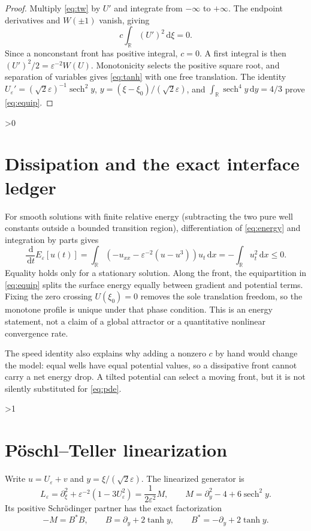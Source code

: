 \documentclass[10pt]{article}
\newcommand{\dd}{\,\mathrm d}
\newcommand{\sech}{\operatorname{sech}}
\newcommand{\eps}{\varepsilon}
\begin{document}
\begin{proof}
Multiply \eqref{eq:tw} by $U'$ and integrate from $-\infty$ to $+\infty$.
The endpoint derivatives and $W(\pm1)$ vanish, giving
\[
 c\int_{\mathbb R}(U')^2\dd\xi=0.
\]
Since a nonconstant front has positive integral, $c=0$.  A first integral is
then $(U')^2/2=\eps^{-2}W(U)$.  Monotonicity selects the positive square root,
and separation of variables gives \eqref{eq:tanh} with one free translation.
The identity $U_\eps'=(\sqrt2\eps)^{-1}\sech^2 y$,
$y=(\xi-\xi_0)/(\sqrt2\eps)$, and
$\int_{\mathbb R}\sech^4y\dd y=4/3$ prove \eqref{eq:equip}.
\end{proof}

\ifnum\CRevisionRound>0
\section{Dissipation and the exact interface ledger}
For smooth solutions with finite relative energy (subtracting the two pure
well constants outside a bounded transition region), differentiation of
\eqref{eq:energy} and integration by parts gives
\begin{equation}
 \frac{\dd}{\dd t}E_\eps[u(t)]
 =\int_{\mathbb R}(-u_{xx}-\eps^{-2}(u-u^3))u_t\dd x
 =-\int_{\mathbb R}u_t^2\dd x\leq0.
 \label{eq:dissipation}
\end{equation}
Equality holds only for a stationary solution.  Along the front, the
equipartition in \eqref{eq:equip} splits the surface energy equally between
gradient and potential terms.  Fixing the zero crossing $U(\xi_0)=0$ removes
the sole translation freedom, so the monotone profile is unique under that
phase condition.  This is an energy statement, not a claim of a global
attractor or a quantitative nonlinear convergence rate.

The speed identity also explains why adding a nonzero $c$ by hand would change
the model: equal wells have equal potential values, so a dissipative front
cannot carry a net energy drop.  A tilted potential can select a moving front,
but it is not silently substituted for \eqref{eq:pde}.
\fi

\ifnum\CRevisionRound>1
\section{Pöschl--Teller linearization}
Write $u=U_\eps+v$ and $y=\xi/(\sqrt2\eps)$.  The linearized generator is
\begin{equation}
 L_\eps=\partial_\xi^2+\eps^{-2}(1-3U_\eps^2)
 =\frac1{2\eps^2}M,\qquad
 M=\partial_y^2-4+6\sech^2y.
 \label{eq:lin}
\end{equation}
Its positive Schrödinger partner has the exact factorization
\begin{equation}
 -M=B^*B,\qquad B=\partial_y+2\tanh y,
 \qquad B^*=-\partial_y+2\tanh y.
 \label{eq:factor}
\end{equation}
\end{document}
